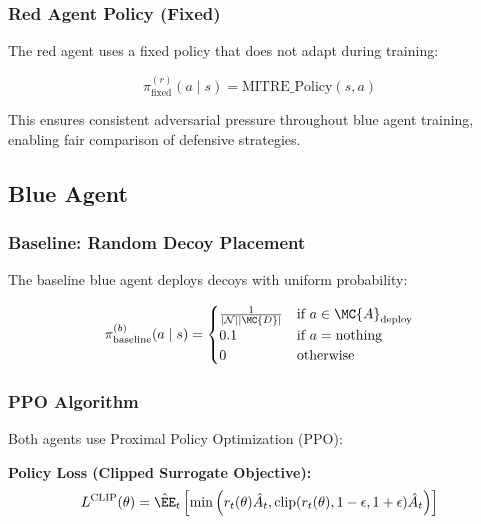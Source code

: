 \documentclass[12pt,oneside]{article}
\begin{document}

\subsubsection{Red Agent Policy (Fixed)}
The red agent uses a fixed policy that does not adapt during training:

\begin{equation}
\pi^{(r)}_{\text{fixed}}(a \mid s) = \text{MITRE\_Policy}(s, a)
\end{equation}

This ensures consistent adversarial pressure throughout blue agent training, enabling fair comparison of defensive strategies.

\subsection{Blue Agent}

\subsubsection{Baseline: Random Decoy Placement}
The baseline blue agent deploys decoys with uniform probability:

\begin{equation}
\pi^{(b)}_{\text{baseline}}(a \mid s) = \begin{cases}
\frac{1}{|\mathcal{N}||\MC{D}|} & \text{if } a \in \MC{A}_{\text{deploy}} \\
0.1 & \text{if } a = \text{nothing} \\
0 & \text{otherwise}
\end{cases}
\end{equation}

\subsubsection{PPO Algorithm}

Both agents use Proximal Policy Optimization (PPO):

\textbf{Policy Loss (Clipped Surrogate Objective):}
\begin{equation}
L^{\text{CLIP}}(\theta) = \hat{\EE}_t\left[\min\left(r_t(\theta)\hat{A}_t, \text{clip}(r_t(\theta), 1-\epsilon, 1+\epsilon)\hat{A}_t\right)\right]
\end{equation}
\end{document}
